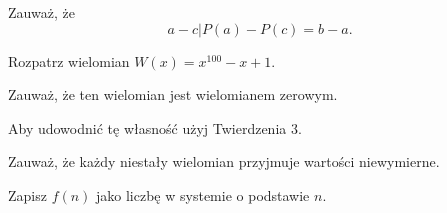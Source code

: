 
\begin{hints_list}
	\item Zauważ, że
	\[
		a - c \big| P(a) - P(c) = b - a.
	\]
	\item Rozpatrz wielomian $W(x) = x^{100} - x + 1$.
	\item Zauważ, że ten wielomian jest wielomianem zerowym.
	\item Aby udowodnić tę własność użyj Twierdzenia 3.
	\item Zauważ, że każdy niestały wielomian przyjmuje wartości niewymierne.
	\item Zapisz $f(n)$ jako liczbę w systemie o podstawie $n$.
\end{hints_list}